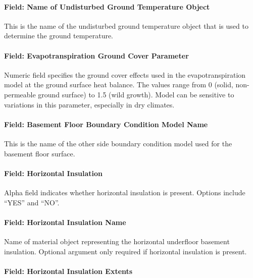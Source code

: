 \paragraph{Field: Name of Undisturbed Ground Temperature Object}\label{field-name-of-undisturbed-ground-temperature-object-1-000}

This is the name of the undisturbed ground temperature object that is used to determine the ground temperature.

\paragraph{Field: Evapotranspiration Ground Cover Parameter}\label{field-evapotranspiration-ground-cover-parameter-2}

Numeric field specifies the ground cover effects used in the evapotranspiration model at the ground surface heat balance. The values range from 0 (solid, non-permeable ground surface) to 1.5 (wild growth). Model can be sensitive to variations in this parameter, especially in dry climates.

\paragraph{Field: Basement Floor Boundary Condition Model Name}\label{field-basement-floor-boundary-condition-model-name}

This is the name of the other side boundary condition model used for the basement floor surface.

\paragraph{Field: Horizontal Insulation}\label{field-horizontal-insulation-1}

Alpha field indicates whether horizontal insulation is present. Options include ``YES'' and ``NO''.

\paragraph{Field: Horizontal Insulation Name}\label{field-horizontal-insulation-name}

Name of material object representing the horizontal underfloor basement insulation. Optional argument only required if horizontal insulation is present.

\paragraph{Field: Horizontal Insulation Extents}\label{field-horizontal-insulation-extents-1}

